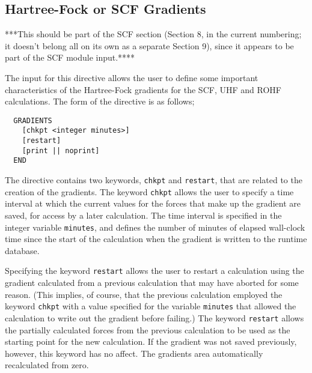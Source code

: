 \subsection{Hartree-Fock or SCF Gradients}

\Large
***This should be part of the SCF section (Section 8, in the current
numbering; it doesn't belong all on its own as a separate Section 9),
 since
it appears to be part of the SCF module input.****
\normalsize

The input for this directive allows the user to define some important
characteristics of the Hartree-Fock gradients for the SCF, UHF and ROHF
calculations.  The form of the directive is as follows;

\begin{verbatim}
  GRADIENTS 
    [chkpt <integer minutes>]
    [restart]
    [print || noprint]
  END
\end{verbatim}


The directive contains two keywords, \verb+chkpt+ and \verb+restart+,
that are related to the creation of the gradients.  The keyword \verb+chkpt+
allows the user to specify a time interval at which the current values
for the forces that make up 
the gradient are saved, for access by a later calculation.  The time
interval is specified in the integer variable \verb+minutes+, and defines
the number of minutes of elapsed wall-clock time since the start of the
calculation when the gradient is written to the runtime database.




Specifying the keyword \verb+restart+ allows the user to restart a calculation
using the gradient calculated from a previous calculation that may have
aborted for some reason.  (This implies, of course, that the previous
calculation employed the keyword \verb+chkpt+ with a value specified for
the variable \verb+minutes+ that allowed the calculation to write out the
gradient before failing.)  The keyword \verb+restart+ allows the partially
calculated forces from the previous calculation to be used as the starting
point for the new calculation.  If the gradient was not saved previously,
however, this keyword has no affect.  The gradients area automatically 
recalculated from zero.

